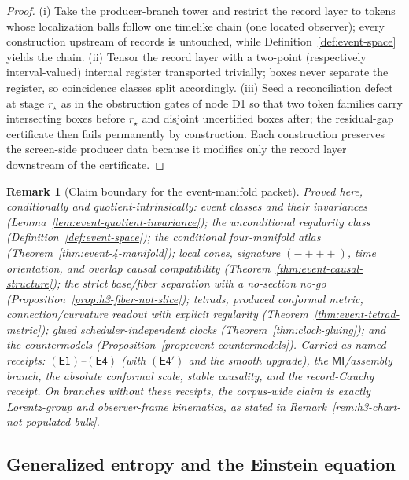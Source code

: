\documentclass[11pt]{article}
\newtheorem{remark}[theorem]{Remark}
\begin{document}
\begin{proof}
(i) Take the producer-branch tower and restrict the record layer to tokens
whose localization balls follow one timelike chain (one located observer);
every construction upstream of records is untouched, while
Definition~\ref{def:event-space} yields the chain. (ii) Tensor the record
layer with a two-point (respectively interval-valued) internal register
transported trivially; boxes never separate the register, so coincidence
classes split accordingly. (iii) Seed a reconciliation defect at stage
\(r_\star\) as in the obstruction gates of node D1 so that two token families
carry intersecting boxes before \(r_\star\) and disjoint uncertified boxes
after; the residual-gap certificate then fails permanently by construction.
Each construction preserves the screen-side producer data because it modifies
only the record layer downstream of the certificate.
\end{proof}

\begin{remark}[Claim boundary for the event-manifold packet]
\label{rem:event-manifold-claim-boundary}
Proved here, conditionally and quotient-intrinsically: event classes and
their invariances (Lemma~\ref{lem:event-quotient-invariance}); the
unconditional regularity class (Definition~\ref{def:event-space}); the
conditional four-manifold atlas (Theorem~\ref{thm:event-4-manifold}); local
cones, signature \((-{+}{+}{+})\), time orientation, and overlap causal
compatibility (Theorem~\ref{thm:event-causal-structure}); the strict
base/fiber separation with a no-section no-go
(Proposition~\ref{prop:h3-fiber-not-slice}); tetrads, produced conformal
metric, connection/curvature readout with explicit regularity
(Theorem~\ref{thm:event-tetrad-metric}); glued scheduler-independent clocks
(Theorem~\ref{thm:clock-gluing}); and the countermodels
(Proposition~\ref{prop:event-countermodels}). Carried as named receipts:
\(\mathsf{(E1)}\)--\(\mathsf{(E4)}\) (with \(\mathsf{(E4')}\) and the smooth
upgrade), the \(\mathsf{MI}\)/assembly branch, the absolute conformal scale,
stable causality, and the record-Cauchy receipt. On branches without these
receipts, the corpus-wide claim is exactly Lorentz-group and observer-frame
kinematics, as stated in Remark~\ref{rem:h3-chart-not-populated-bulk}.
\end{remark}

\subsection{Generalized entropy and the Einstein equation}
\end{document}
